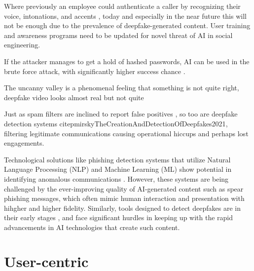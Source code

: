 Where previously an employee could authenticate a caller by recognizing their voice, intonations, and accents \citep{mitnickArtDeceptionControlling2003}, today and especially in the near future this will not be enough due to the prevalence of deepfake-generated content. User training and awareness programs need to be updated for novel threat of AI in social engineering.



If the attacker manages to get a hold of hashed passwords, AI can be used in the brute force attack, with significantly higher success chance \citep{blauthArtificialIntelligenceCrime2022}.

The uncanny valley is a phenomenal feeling that something is not quite right, deepfake video looks almost real but not quite


Just as spam filters are inclined to report false positives \citep{fakhouriAIDrivenSolutionsForSocialEngineeringAttacks2024}, so too are deepfake detection systems citep{mirskyTheCreationAndDetectionOfDeepfakes2021}, filtering legitimate communications causing operational hiccups and perhaps lost engagements.

Technological solutions like phishing detection systems that utilize Natural Language Processing (NLP) and Machine Learning (ML) show potential in identifying anomalous communications \citep{basitComprehensiveSurveyAIenabledPhishingAttacks2021}. However, these systems are being challenged by the ever-improving quality of AI-generated content such as spear phishing messages, which often mimic human interaction and presentation with hihgher and higher fidelity. Similarly, tools designed to detect deepfakes are in their early stages \citep{mirskyTheCreationAndDetectionOfDeepfakes2021}, and face significant hurdles in keeping up with the rapid advancements in AI technologies that create such content.










\section{User-centric}

\begin{comment}    
    - Deepfake content detection
    - Spear phishing detection
\end{comment}


